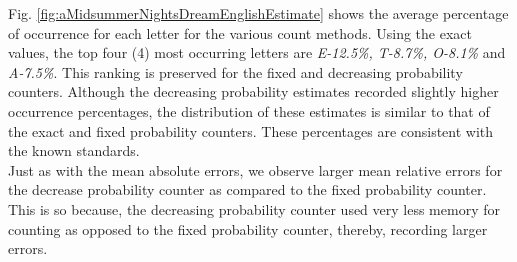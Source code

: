 \documentclass[longpaper, english, final, times]{revdetua}
\begin{document}
				Fig. \ref{fig:aMidsummerNightsDreamEnglishEstimate} shows the average percentage of occurrence for each letter for the various count methods. Using the exact values, the top four (4) most occurring letters are \textit{E-12.5\%, T-8.7\%, O-8.1\%} and \textit{A-7.5\%}. This ranking is preserved for the fixed and decreasing probability counters. Although the decreasing probability estimates recorded slightly higher occurrence percentages, the distribution of these estimates is similar to that of the exact and fixed probability counters. These percentages are consistent with the known standards.\\
				
				Just as with the mean absolute errors, we observe larger mean relative errors for the decrease probability counter as compared to the fixed probability counter. This is so because, the decreasing probability counter used very less memory for counting as opposed to the fixed probability counter, thereby, recording larger errors. \\
				
\end{document}
